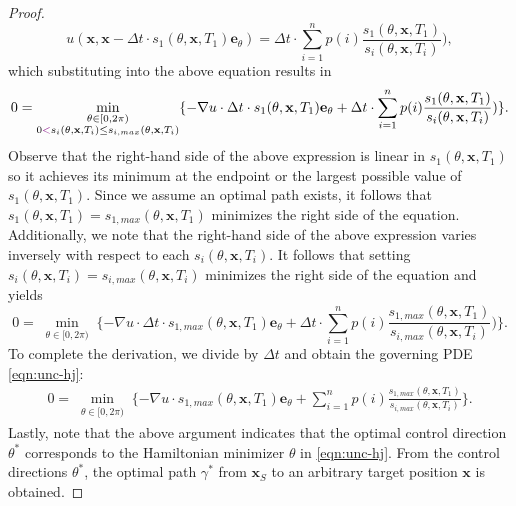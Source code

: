 \documentclass[10pt,a4paper]{amsart}
\def \be{{\mathbf {e}}}
\def \bx{{\mathbf {x}}}
\begin{document}
\begin{proof}
    \begin{equation}
        u(\bx,\bx-\Delta t \cdot s_1(\theta,\bx,T_1)\be_\theta) = \Delta t \cdot \sum_{i=1}^{n} p(i) \frac{s_1 (\theta, \bx, T_1)}{s_i (\theta, \bx, T_i)}),
    \end{equation}
    which substituting into the above equation results in 
    \begin{equation}
        0 = \min\limits_{\substack{\theta \in [0,2\pi) \\ 0 {\color{violet} <}  s_i(\theta,\bx,T_i) \leq s_{i,max}(\theta, \bx,T_i) }} \{ - \nabla u \cdot \Delta t \cdot s_1(\theta,\bx,T_1)\be_\theta + \Delta t \cdot \sum_{i=1}^{n} p(i) \frac{s_1 (\theta, \bx, T_1)}{s_i (\theta, \bx, T_i)})\}.
    \end{equation}
    Observe that the right-hand side of the above expression is linear in $s_1(\theta,\bx,T_1)$ so it achieves its minimum at the endpoint or the largest possible value of $s_1(\theta,\bx,T_1)$.  Since we assume an optimal path exists, it follows that $s_1(\theta,\bx,T_1)=s_{1,max}(\theta,\bx,T_1)$ minimizes the right side of the equation.  Additionally, we note that the right-hand side of the above expression varies inversely with respect to each $s_i(\theta,\bx,T_i)$.  It follows that setting $s_i(\theta,\bx,T_i)=s_{i,max}(\theta,\bx,T_i)$ minimizes the right side of the equation and yields
    \begin{equation}
        0 = \min\limits_{\substack{\theta \in [0,2\pi) }} \{ - \nabla u \cdot \Delta t \cdot s_{1,max}(\theta,\bx,T_1)\be_\theta + \Delta t \cdot \sum_{i=1}^{n} p(i) \frac{s_{1,max} (\theta, \bx, T_1)}{s_{i,max} (\theta, \bx, T_i)})\}.
    \end{equation}
To complete the derivation, we divide by $\Delta t$ and obtain the governing PDE
 \eqref{eqn:unc-hj}:
    \begin{align}
        0 = \min\limits_{\substack{\theta \in [0,2\pi)}} \{ - \nabla u  \cdot s_{1,max}(\theta,\bx,T_1)\be_\theta + \sum_{i=1}^{n} p(i) \frac{s_{1,max} (\theta, \bx, T_1)}{s_{i,max} (\theta, \bx, T_i)}\}.
    \end{align}
Lastly, note that the above argument indicates that the optimal control direction $\theta^*$ corresponds to the Hamiltonian minimizer $\theta$ in \eqref{eqn:unc-hj}.  From the control directions $\theta^*$, the optimal path $\gamma^*$ from $\bx_S$ to an arbitrary target position $\bx$ is obtained.


\end{proof}
\end{document}
